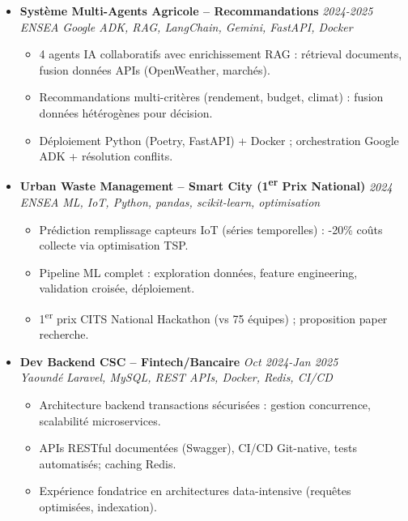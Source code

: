 \documentclass[a4paper,11pt]{article}
\begin{document}
\begin{itemize}[leftmargin=*, label=\tiny$\bullet$, nosep]
    \item \textbf{Syst\`eme Multi-Agents Agricole -- Recommandations} \hfill \textit{2024-2025} \\
    \textit{ENSEA} \hfill \textit{Google ADK, RAG, LangChain, Gemini, FastAPI, Docker}
    \vspace{-2pt}
    \begin{itemize}[leftmargin=0.4cm, nosep, label=\tiny$\bullet$]
        \item \small{4 agents IA collaboratifs avec enrichissement RAG : r\'etrieval documents, fusion donn\'ees APIs (OpenWeather, marchés).}
        \item \small{Recommandations multi-crit\`eres (rendement, budget, climat) : fusion donn\'ees h\'et\'erog\`enes pour d\'ecision.}
        \item \small{D\'eploiement Python (Poetry, FastAPI) + Docker ; orchestration Google ADK + r\'esolution conflits.}
    \end{itemize}
    \vspace{3pt}

    \item \textbf{Urban Waste Management -- Smart City (1\textsuperscript{er} Prix National)} \hfill \textit{2024} \\
    \textit{ENSEA} \hfill \textit{ML, IoT, Python, pandas, scikit-learn, optimisation}
    \vspace{-2pt}
    \begin{itemize}[leftmargin=0.4cm, nosep, label=\tiny$\bullet$]
        \item \small{Pr\'ediction remplissage capteurs IoT (s\'eries temporelles) : -20\% co\^uts collecte via optimisation TSP.}
        \item \small{Pipeline ML complet : exploration donn\'ees, feature engineering, validation crois\'ee, d\'eploiement.}
        \item \small{1\textsuperscript{er} prix CITS National Hackathon (vs 75 \'equipes) ; proposition paper recherche.}
    \end{itemize}
    \vspace{3pt}

    \item \textbf{Dev Backend CSC -- Fintech/Bancaire} \hfill \textit{Oct 2024-Jan 2025} \\
    \textit{Yaound\'e} \hfill \textit{Laravel, MySQL, REST APIs, Docker, Redis, CI/CD}
    \vspace{-2pt}
    \begin{itemize}[leftmargin=0.4cm, nosep, label=\tiny$\bullet$]
        \item \small{Architecture backend transactions s\'ecuris\'ees : gestion concurrence, scalabilit\'e microservices.}
        \item \small{APIs RESTful document\'ees (Swagger), CI/CD Git-native, tests automatis\'es; caching Redis.}
        \item \small{Exp\'erience fondatrice en architectures data-intensive (requ\^etes optimis\'ees, indexation).}
    \end{itemize}
    \vspace{3pt}


\end{itemize}
\end{document}
